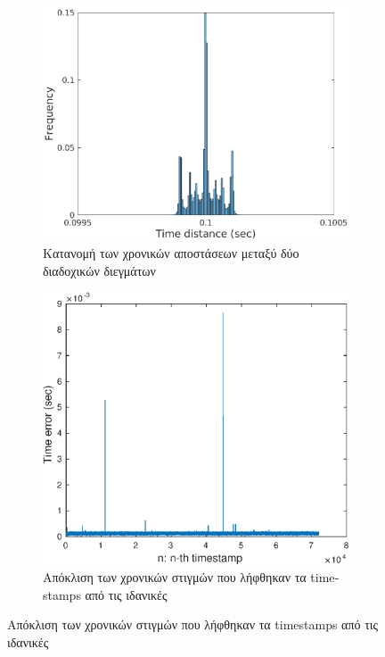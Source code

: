 \documentclass[a4paper,12pt]{article}
\begin{document}
\begin{figure}
	\hspace{-1cm}
	\begin{subfigure}[b]{0.6\textwidth}
		\includegraphics[width=\textwidth]{hist1.eps}
		\caption{Κατανομή των χρονικών αποστάσεων μεταξύ δύο διαδοχικών διεγμάτων}
		\label{fig:hist1}
	\end{subfigure}
	\begin{subfigure}[b]{0.5\textwidth}
		\includegraphics[width=\textwidth]{error1.eps}
		\caption{Απόκλιση των χρονικών στιγμών που λήφθηκαν τα \textlatin{timestamps} από τις ιδανικές}
		\label{fig:error1}
	\end{subfigure}
\end{figure}
\end{document}
